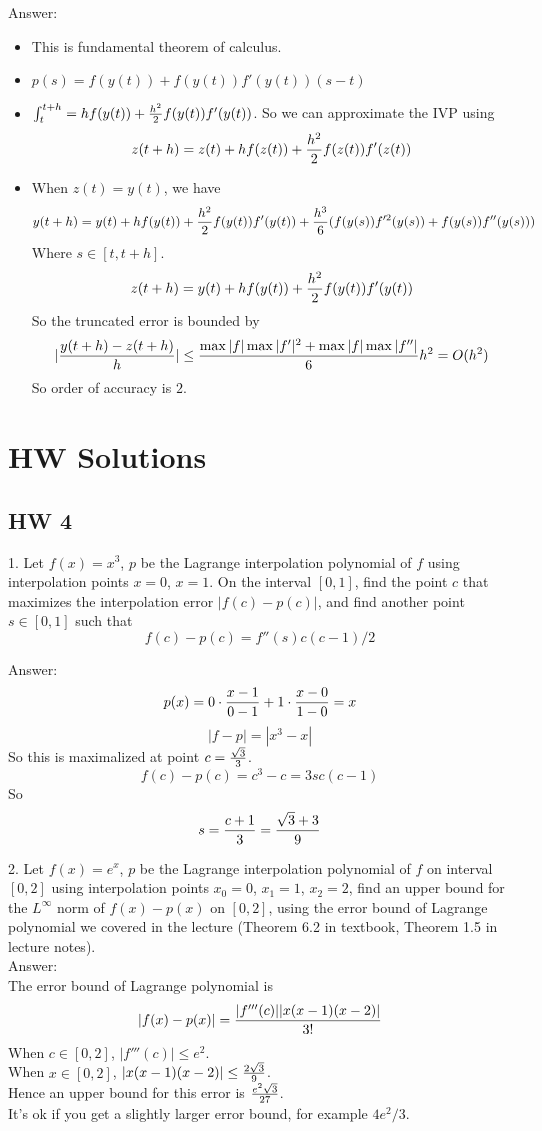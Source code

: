 \documentclass[20pt]{article} %
\theoremstyle{break}
\begin{document}
Answer:
\begin{itemize}
\item This is fundamental theorem of calculus.
\item $p(s)=f(y(t))+f(y(t))f'(y(t))(s-t)$
\item $\int_t^{t+h}=hf(y(t))+{h^2\over 2}f(y(t))f'(y(t))$. So we can approximate the IVP using
  \[z(t+h)=z(t)+hf(z(t))+{h^2\over 2}f(z(t))f'(z(t))\]
\item When $z(t)=y(t)$, we have
  \[y(t+h)=y(t)+hf(y(t))+{h^2\over 2}f(y(t))f'(y(t))+{h^3\over 6}(f(y(s))f'^2(y(s))+f(y(s))f''(y(s)))\]
  Where $s\in [t, t+h]$.
  \[z(t+h)=y(t)+hf(y(t))+{h^2\over 2}f(y(t))f'(y(t))\]
  So the truncated error is bounded by
  \[|{y(t+h)-z(t+h)\over h}|\leq {\max|f|\max|f'|^2+\max|f|\max|f''|\over 6}h^2=O(h^2)\]
  So order of accuracy is $2$.

\end{itemize}

\section{HW Solutions}

\subsection{HW 4}

1. Let $f(x)=x^3$, $p$ be the Lagrange interpolation polynomial of $f$ using interpolation points $x=0$, $x=1$.  On the interval $[0, 1]$, find the point $c$ that maximizes the interpolation error $|f(c)-p(c)|$, and find another point $s\in [0, 1]$ such that
\[f(c)-p(c)=f''(s)c(c-1)/2\]

Answer:\\

\[p(x)=0\cdot{x-1\over 0-1}+1\cdot{x-0\over 1-0}=x\]
\[|f-p|=|x^3-x|\]
So this is maximalized at point $c={\sqrt{3}\over 3}$.
\[f(c)-p(c)=c^3-c=3sc(c-1)\]
So
\[s={c+1\over 3}={\sqrt{3}+3\over 9}\]

2. Let $f(x)=e^x$, $p$ be the Lagrange interpolation polynomial of $f$ on interval $[0, 2]$ using interpolation points $x_0=0$, $x_1=1$, $x_2=2$, find an upper bound for the $L^\infty$ norm of $f(x)-p(x)$ on $[0, 2]$, using the error bound of Lagrange polynomial we covered in the lecture (Theorem 6.2 in textbook, Theorem 1.5 in lecture notes).\\

Answer:\\

The error bound of Lagrange polynomial is
\[|f(x)-p(x)|={|f'''(c)||x(x-1)(x-2)|\over 3!}\]
When $c\in [0, 2]$, $|f'''(c)|\leq e^2$.\\
When $x\in [0, 2]$, $|x(x-1)(x-2)|\leq {2\sqrt{3}\over 9}$.\\
Hence an upper bound for this error is $e^2\sqrt{3}\over 27$.\\
It's ok if you get a slightly larger error bound, for example $4e^2/3$.\\
\end{document}
